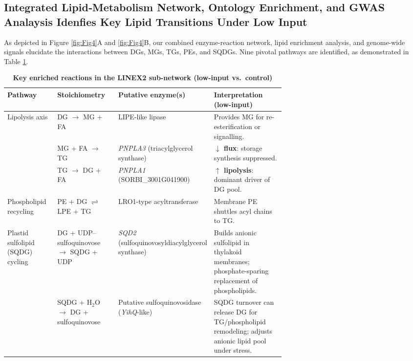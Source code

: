 \documentclass[10pt,letterpaper]{article}
\begin{document}
\subsection*{Integrated Lipid‐Metabolism Network, Ontology Enrichment, and GWAS Analaysis Idenfies Key Lipid Transitions Under Low Input}

As depicted in Figure \ref{fig:Fig4}A and \ref{fig:Fig4}B, our combined enzyme-reaction network, lipid enrichment analysis, and genome-wide signals elucidate the interactions between DGs, MGs, TGs, PEs, and SQDGs. Nine pivotal pathways are identified, as demonstrated in Table \ref{tab:linex_reactions}.

\begin{table}[!ht]
  \centering
  \footnotesize
  \setlength{\tabcolsep}{4pt}
  \renewcommand{\arraystretch}{1.2}
  \caption{\textbf{Key enriched reactions in the LINEX2 sub-network (low-input vs.\ control)}}
  \label{tab:linex_reactions}
  \begin{tabularx}{\linewidth}{@{}%
      p{0.18\linewidth}
      p{0.22\linewidth}
      p{0.26\linewidth}
      X
    @{}}
    \toprule
    \textbf{Pathway} & \textbf{Stoichiometry} & \textbf{Putative enzyme(s)} & \textbf{Interpretation (low-input)} \\
    \midrule
    Lipolysis axis
      & DG $\rightarrow$ MG + FA
      & LIPE-like lipase
      & Provides MG for re-esterification or signalling. \\
    & MG + FA $\rightarrow$ TG
      & \textit{PNPLA3} (triacylglycerol synthase)
      & \textbf{$\downarrow$ flux}: storage synthesis suppressed. \\
    & TG $\rightarrow$ DG + FA
      & \textit{PNPLA1} (SORBI\_3001G041900)
      & \textbf{$\uparrow$ lipolysis}: dominant driver of DG pool. \\
    \addlinespace
    Phospholipid recycling
      & PE + DG $\rightleftharpoons$ LPE + TG
      & LRO1-type acyltransferase
      & Membrane PE shuttles acyl chains to TG. \\
    \addlinespace
    Plastid sulfolipid (SQDG) cycling
      & DG + UDP–sulfoquinovose $\rightarrow$ SQDG + UDP
      & \textit{SQD2} (sulfoquinovosyldiacylglycerol synthase)
      & Builds anionic sulfolipid in thylakoid membranes; phosphate-sparing replacement of phospholipids. \\
    & SQDG + H$_2$O $\rightarrow$ DG + sulfoquinovose
      & Putative sulfoquinovosidase (\textit{YihQ}-like)
      & SQDG turnover can release DG for TG/phospholipid remodeling; adjusts anionic lipid pool under stress. \\

\end{tabularx}
\end{table}
\end{document}
